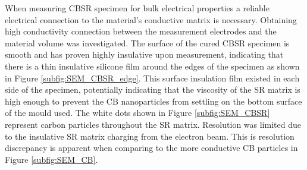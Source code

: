 When measuring CBSR specimen for bulk electrical properties a reliable electrical connection to the material's conductive matrix is necessary. Obtaining high conductivity connection between the measurement electrodes and the material volume was investigated. The surface of the cured CBSR specimen is smooth and has proven highly insulative upon measurement, indicating that there is a thin insulative silicone film around the edges of the specimen as shown in Figure \ref{subfig:SEM_CBSR_edge}. This surface insulation film existed in each side of the specimen, potentially indicating that the viscosity of the SR matrix is high enough to prevent the CB nanoparticles from settling on the bottom surface of the mould used. The white dots shown in Figure \ref{subfig:SEM_CBSR} represent carbon particles throughout the SR matrix. Resolution was limited due to the insulative SR matrix charging from the electron beam. This is resolution discrepancy is apparent when comparing to the more conductive CB particles in Figure \ref{subfig:SEM_CB}.

